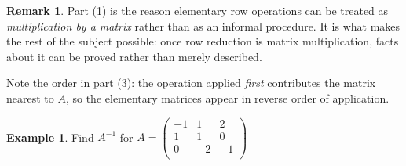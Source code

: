 \documentclass[11pt,a4paper]{article}
\theoremstyle{definition}
\newtheorem{exa}[thm]{Example}
\newtheorem*{remark}{Remark}
\begin{document}
\begin{remark}
Part (1) is the reason elementary row operations can be treated as
\emph{multiplication by a matrix} rather than as an informal procedure. It is
what makes the rest of the subject possible: once row reduction is matrix
multiplication, facts about it can be proved rather than merely described.

Note the order in part (3): the operation applied \emph{first} contributes the
matrix nearest to $A$, so the elementary matrices appear in reverse order of
application.
\end{remark}
\begin{exa}
Find $A^{-1}$ for $A=
\begin{pmatrix}
-1&1&2\\ 1&1&0\\ 0&-2&-1\\
\end{pmatrix}
$
\end{exa}
\end{document}
